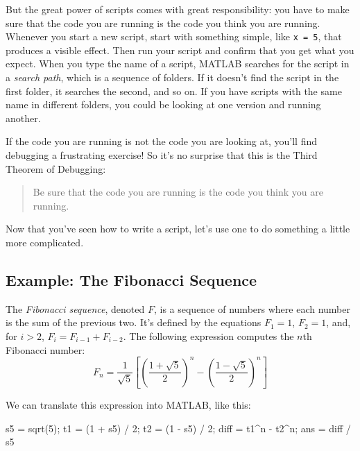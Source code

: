 

But the great power of scripts comes with great responsibility: you have to make sure that the code you are running is the code you think you are running.
Whenever you start a new script, start with something simple, like \lstinline{x = 5}, that produces a visible effect. Then run your script and confirm that you get what you expect.
When you type the name of a script, MATLAB searches for the script in a \emph{search path}, which is a sequence of folders.  If it doesn't find the script in the first folder, it searches the second, and so on.
If you have scripts with the same name in different folders, you could be looking at one version and running another.



If the code you are running is not the code you are looking
at, you'll find debugging a frustrating exercise!  So it's no surprise that this is the Third Theorem of Debugging:

\begin{quote}
Be sure that the code you are running
is the code you think you are running.
\end{quote}

Now that you've seen how to write a script, let's use one to do something a little more complicated.

\subsection{Example: The Fibonacci Sequence}


The \emph{Fibonacci sequence}, denoted $F$, is a sequence of numbers where each number is the sum of the previous two.
It's defined by the equations $F_1 = 1$, $F_2 = 1$, and, for $i > 2$, $F_{i} = F_{i-1} + F_{i-2}$.
The following expression computes the $n$th Fibonacci number:
%
\begin{equation*}
F_n = \frac{1}{\sqrt{5}}
\left[
\left( \frac{1 + \sqrt{5}}{2} \right)^{n} -
\left( \frac{1 - \sqrt{5}}{2} \right)^{n}
\right]
\end{equation*}
%

We can translate this expression into MATLAB, like this:

\begin{code}
s5 = sqrt(5);
t1 = (1 + s5) / 2;
t2 = (1 - s5) / 2;
diff = t1^n - t2^n;
ans = diff / s5
\end{code}

